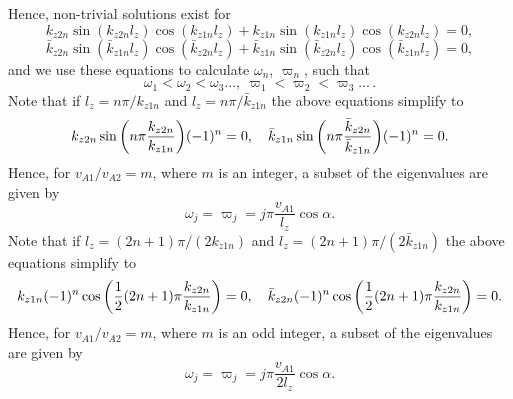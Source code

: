 \documentclass{article}
\begin{document}
Hence, non-trivial solutions exist for
\[k_{z2n}\sin(k_{z2n}l_z)\cos(k_{z1n}l_z)+k_{z1n}\sin(k_{z1n}l_z)\cos(k_{z2n}l_z)=0,\]
\[\bar{k}_{z2n}\sin(\bar{k}_{z1n}l_z)\cos(\bar{k}_{z2n}l_z)+\bar{k}_{z1n}\sin(\bar{k}_{z2n}l_z)\cos(\bar{k}_{z1n}l_z)=0,\]
and we use these equations to calculate $\omega_n$, $\varpi_n$, such that
\[\omega_1<\omega_2<\omega_3...,\ \varpi_1<\varpi_2<\varpi_3...\,.\]
Note that if $l_z=n\pi/k_{z1n}$ and $l_z=n\pi/\bar{k}_{z1n}$ the above equations simplify to
\[k_{z2n}\sin\qty(n\pi\frac{k_{z2n}}{k_{z1n}})(-1)^n=0,\quad \bar{k}_{z1n}\sin\qty(n\pi\frac{\bar{k}_{z2n}}{\bar{k}_{z1n}})(-1)^n=0.\]
Hence, for $v_{A1}/v_{A2}=m$, where $m$ is an integer, a subset of the eigenvalues are given by
\[\omega_j = \varpi_j= j\pi\frac{v_{A1}}{l_z}\cos\alpha.\]
Note that if $l_z=(2n+1)\pi/(2k_{z1n})$ and $l_z=(2n+1)\pi/(2\bar{k}_{z1n})$ the above equations simplify to
\[k_{z1n}(-1)^n\cos\qty(\frac{1}{2}(2n+1)\pi\frac{k_{z2n}}{k_{z1n}})=0,\quad
\bar{k}_{z2n}(-1)^n\cos\qty(\frac{1}{2}(2n+1)\pi\frac{k_{z2n}}{k_{z1n}})=0.\]
Hence, for $v_{A1}/v_{A2}=m$, where $m$ is an odd integer, a subset of the eigenvalues are given by
\[\omega_j = \varpi_j= j\pi\frac{v_{A1}}{2l_z}\cos\alpha.\]
\end{document}
